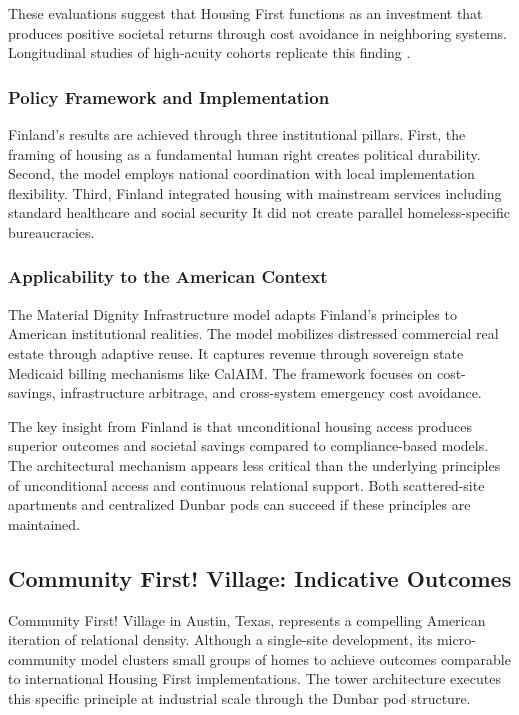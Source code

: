 \documentclass[12pt, letterpaper]{article}
\begin{document}
These evaluations suggest that Housing First functions as an investment that produces positive societal returns through cost avoidance in neighboring systems. Longitudinal studies of high-acuity cohorts replicate this finding \citep{larimer_2009}.

\subsubsection{Policy Framework and Implementation}

Finland's results are achieved through three institutional pillars. First, the framing of housing as a fundamental human right creates political durability. Second, the model employs national coordination with local implementation flexibility. Third, Finland integrated housing with mainstream services including standard healthcare and social security It did not create parallel homeless-specific bureaucracies.

\subsubsection{Applicability to the American Context}

The Material Dignity Infrastructure model adapts Finland's principles to American institutional realities. The model mobilizes distressed commercial real estate through adaptive reuse. It captures revenue through sovereign state Medicaid billing mechanisms like CalAIM. The framework focuses on cost-savings, infrastructure arbitrage, and cross-system emergency cost avoidance.

The key insight from Finland is that unconditional housing access produces superior outcomes and societal savings compared to compliance-based models. The architectural mechanism appears less critical than the underlying principles of unconditional access and continuous relational support. Both scattered-site apartments and centralized Dunbar pods can succeed if these principles are maintained.

\subsection{Community First! Village: Indicative Outcomes}

Community First! Village in Austin, Texas, represents a compelling American iteration of relational density. Although a single-site development, its micro-community model clusters small groups of homes to achieve outcomes comparable to international Housing First implementations. The tower architecture executes this specific principle at industrial scale through the Dunbar pod structure.
\end{document}
